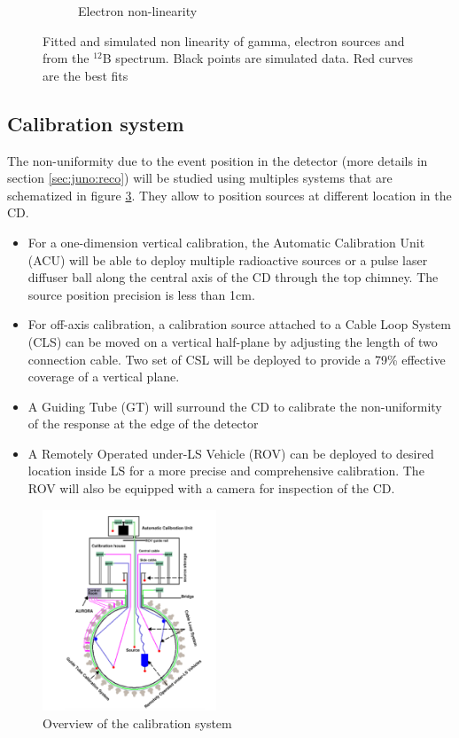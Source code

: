 \begin{figure}[ht]
\begin{subfigure}[b]{0.37\textwidth}
    \caption{Electron non-linearity}
    \label{fig:juno:nl:electron}
  \end{subfigure}
  \caption{Fitted and simulated non linearity of gamma, electron sources and from the $^{12}$B spectrum. Black points are simulated data. Red curves are the best fits}
  \label{fig:juno:nl}
\end{figure}

\subsection{Calibration system}

The non-uniformity due to the event position in the detector (more details in section \ref{sec:juno:reco}) will be studied using multiples systems that are schematized in figure \ref{fig:juno:calib}. They allow to position sources at different location in the CD.

\begin{itemize}
  \item For a one-dimension vertical calibration, the Automatic Calibration Unit (ACU) will be able to deploy multiple radioactive sources or a pulse laser diffuser ball along the central axis of the CD through the top chimney. The source position precision is less than 1cm.
  \item For off-axis calibration, a calibration source attached to a Cable Loop System (CLS) can be moved on a vertical half-plane by adjusting the length of two connection cable. Two set of CSL will be deployed to provide a 79\% effective coverage of a vertical plane.
  \item A Guiding Tube (GT) will surround the CD to calibrate the non-uniformity of the response at the edge of the detector
  \item A Remotely Operated under-LS Vehicle (ROV) can be deployed to desired location inside LS for a more precise and comprehensive calibration. The ROV will also be equipped with a camera for inspection of the CD.
\end{itemize}

\begin{figure}[ht]
  \centering
  \includegraphics[height=6cm]{images/juno/calib.png}
  \caption{Overview of the calibration system}
  \label{fig:juno:calib}
\end{figure}

